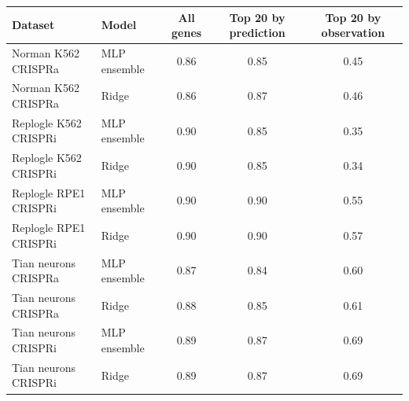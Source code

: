 \begin{tabular}{llccc}
\toprule
Dataset & Model & All genes & Top 20 by prediction & Top 20 by observation \\
\midrule
Norman K562 CRISPRa & MLP ensemble & 0.86 & 0.85 & 0.45 \\
Norman K562 CRISPRa & Ridge & 0.86 & 0.87 & 0.46 \\
Replogle K562 CRISPRi & MLP ensemble & 0.90 & 0.85 & 0.35 \\
Replogle K562 CRISPRi & Ridge & 0.90 & 0.85 & 0.34 \\
Replogle RPE1 CRISPRi & MLP ensemble & 0.90 & 0.90 & 0.55 \\
Replogle RPE1 CRISPRi & Ridge & 0.90 & 0.90 & 0.57 \\
Tian neurons CRISPRa & MLP ensemble & 0.87 & 0.84 & 0.60 \\
Tian neurons CRISPRa & Ridge & 0.88 & 0.85 & 0.61 \\
Tian neurons CRISPRi & MLP ensemble & 0.89 & 0.87 & 0.69 \\
Tian neurons CRISPRi & Ridge & 0.89 & 0.87 & 0.69 \\
\bottomrule
\end{tabular}